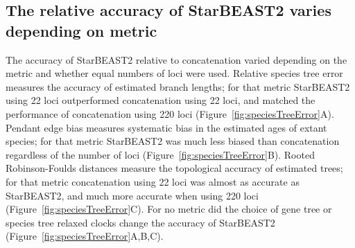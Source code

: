 \documentclass[12pt]{article}
\begin{document}
\subsection{The relative accuracy of StarBEAST2 varies depending on metric}

The accuracy of StarBEAST2 relative to concatenation varied depending on the
metric and whether equal numbers of loci were used. Relative species tree error
measures the accuracy of estimated branch lengths; for that metric StarBEAST2
using 22 loci outperformed concatenation using 22 loci, and matched the
performance of concatenation using 220 loci
(Figure~\ref{fig:speciesTreeError}A). Pendant edge bias measures systematic bias
in the estimated ages of extant species; for that metric StarBEAST2 was much
less biased than concatenation regardless of the number of loci
(Figure~\ref{fig:speciesTreeError}B). Rooted Robinson-Foulds distances measure
the topological accuracy of estimated trees; for that metric concatenation using
22 loci was almost as accurate as StarBEAST2, and much more accurate when using
220 loci (Figure~\ref{fig:speciesTreeError}C). For no metric did the choice of
gene tree or species tree relaxed clocks change the accuracy of StarBEAST2
(Figure~\ref{fig:speciesTreeError}A,B,C).
\end{document}
